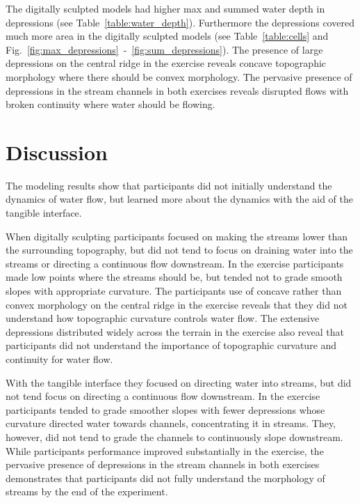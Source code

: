 \documentclass{isprs}
\begin{document}
The digitally sculpted models had higher max and summed 
water depth in depressions (see Table~\ref{table:water_depth}).
Furthermore the depressions covered much more area in the digitally sculpted models
(see Table~\ref{table:cells} and Fig.~\ref{fig:max_depressions}~-~\ref{fig:sum_depressions}).
%
The presence of large depressions on the central ridge in the  exercise reveals 
concave topographic morphology where there should be convex morphology.
%
The pervasive presence of depressions in the stream channels in both exercises 
reveals disrupted flows with broken continuity where water should be flowing. 

\section{Discussion}\label{sec:discussion}
%
The modeling results show that participants did not initially understand the dynamics of water flow, but learned more about the dynamics with the aid of the tangible interface.

When digitally sculpting 
participants focused on making the streams lower than the surrounding topography, 
but did not tend to focus on draining water into the streams or 
directing a continuous flow downstream.
%
In the  exercise participants made low points where the streams should be,
but tended not to grade smooth slopes with appropriate curvature. 
%
The participants use of concave rather than convex morphology on the central ridge 
in the  exercise reveals that they did not understand how topographic curvature controls water flow.
%
The extensive depressions distributed widely across the terrain in the  exercise 
also reveal that participants did not understand the importance of topographic curvature and continuity for water flow. 

With the tangible interface they focused on directing water into streams,
but did not tend focus on directing a continuous flow downstream.
%
In the  exercise participants tended to grade 
smoother slopes with fewer depressions whose curvature directed water towards channels, concentrating it in streams. They, however, did not tend to grade the channels to continuously slope downstream. 
%
While participants performance improved substantially in the  exercise, 
the pervasive presence of depressions in the stream channels
in both exercises demonstrates that participants did not fully understand the morphology of streams by the end of the experiment. 
\end{document}
